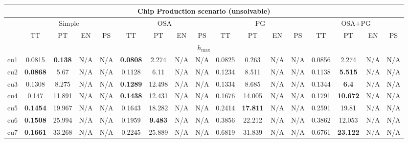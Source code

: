 \begin{tabular}{||c||c|c|c|c||c|c|c|c||c|c|c|c||c|c|c|c||}%
\multicolumn{17}{c}{\textbf{Chip Production scenario (unsolvable)}}\\%
\hline%
&\multicolumn{4}{|c|}{\small{Simple}}&\multicolumn{4}{|c|}{\small{OSA}}&\multicolumn{4}{|c|}{\small{PG}}&\multicolumn{4}{|c|}{\small{OSA+PG}}\\%
\hline%
&\small{TT}&\small{PT}&\small{EN}&\small{PS}&\small{TT}&\small{PT}&\small{EN}&\small{PS}&\small{TT}&\small{PT}&\small{EN}&\small{PS}&\small{TT}&\small{PT}&\small{EN}&\small{PS}\\%
\hline%
\multicolumn{17}{||c||}{$h_{\max}$}\\%
\hline%
cu1&\small{0.0815}&\small{\textbf{0.138}}&\small{N/A}&\small{N/A}&\small{\textbf{0.0808}}&\small{2.274}&\small{N/A}&\small{N/A}&\small{0.0825}&\small{0.263}&\small{N/A}&\small{N/A}&\small{0.0856}&\small{2.274}&\small{N/A}&\small{N/A}\\%
\hline%
cu2&\small{\textbf{0.0868}}&\small{5.67}&\small{N/A}&\small{N/A}&\small{0.1128}&\small{6.11}&\small{N/A}&\small{N/A}&\small{0.1234}&\small{8.511}&\small{N/A}&\small{N/A}&\small{0.1138}&\small{\textbf{5.515}}&\small{N/A}&\small{N/A}\\%
\hline%
cu3&\small{0.1308}&\small{8.275}&\small{N/A}&\small{N/A}&\small{\textbf{0.1289}}&\small{12.498}&\small{N/A}&\small{N/A}&\small{0.1334}&\small{8.685}&\small{N/A}&\small{N/A}&\small{0.1344}&\small{\textbf{6.4}}&\small{N/A}&\small{N/A}\\%
\hline%
cu4&\small{0.147}&\small{11.891}&\small{N/A}&\small{N/A}&\small{\textbf{0.1438}}&\small{12.431}&\small{N/A}&\small{N/A}&\small{0.1676}&\small{14.005}&\small{N/A}&\small{N/A}&\small{0.1791}&\small{\textbf{10.672}}&\small{N/A}&\small{N/A}\\%
\hline%
cu5&\small{\textbf{0.1454}}&\small{19.967}&\small{N/A}&\small{N/A}&\small{0.1643}&\small{18.282}&\small{N/A}&\small{N/A}&\small{0.2414}&\small{\textbf{17.811}}&\small{N/A}&\small{N/A}&\small{0.2591}&\small{19.81}&\small{N/A}&\small{N/A}\\%
\hline%
cu6&\small{\textbf{0.1508}}&\small{25.994}&\small{N/A}&\small{N/A}&\small{0.1959}&\small{\textbf{9.483}}&\small{N/A}&\small{N/A}&\small{0.3856}&\small{22.212}&\small{N/A}&\small{N/A}&\small{0.3862}&\small{12.053}&\small{N/A}&\small{N/A}\\%
\hline%
cu7&\small{\textbf{0.1661}}&\small{33.268}&\small{N/A}&\small{N/A}&\small{0.2245}&\small{25.889}&\small{N/A}&\small{N/A}&\small{0.6819}&\small{31.839}&\small{N/A}&\small{N/A}&\small{0.6761}&\small{\textbf{23.122}}&\small{N/A}&\small{N/A}\\%

\end{tabular}
